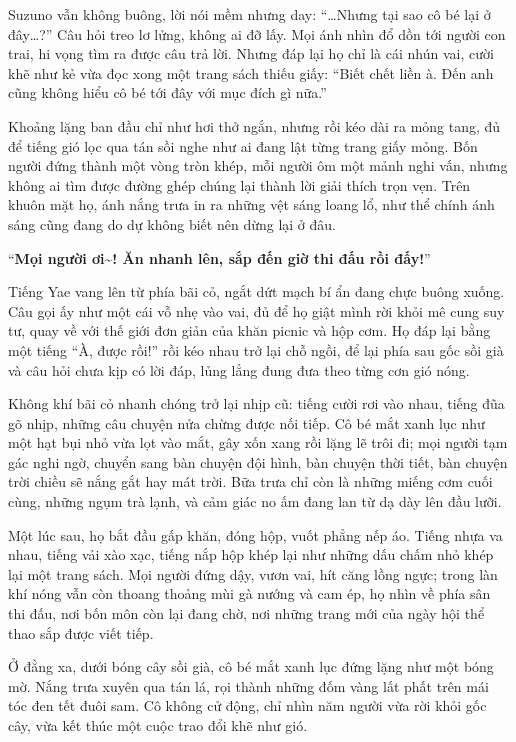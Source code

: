 \documentclass[../main.tex]{subfiles}
\begin{document}
Suzuno vẫn không buông, lời nói mềm nhưng day: ``\dots Nhưng tại sao cô bé lại ở đây\dots?'' Câu hỏi treo lơ lửng, không ai đỡ lấy. Mọi ánh nhìn đổ dồn tới người con trai, hi vọng tìm ra được câu trả lời. Nhưng đáp lại họ chỉ là cái nhún vai, cười khẽ như kẻ vừa đọc xong một trang sách thiếu giấy: ``Biết chết liền à. Đến anh cũng không hiểu cô bé tới đây với mục đích gì nữa.''

Khoảng lặng ban đầu chỉ như hơi thở ngắn, nhưng rồi kéo dài ra mỏng tang, đủ để tiếng gió lọc qua tán sồi nghe như ai đang lật từng trang giấy mỏng. Bốn người đứng thành một vòng tròn khép, mỗi người ôm một mảnh nghi vấn, nhưng không ai tìm được đường ghép chúng lại thành lời giải thích trọn vẹn. Trên khuôn mặt họ, ánh nắng trưa in ra những vệt sáng loang lổ, như thể chính ánh sáng cũng đang do dự không biết nên dừng lại ở đâu.

``\textbf{Mọi người ơi\~{}! Ăn nhanh lên, sắp đến giờ thi đấu rồi đấy!}''

Tiếng Yae vang lên từ phía bãi cỏ, ngắt dứt mạch bí ẩn đang chực buông xuống. Câu gọi ấy như một cái vỗ nhẹ vào vai, đủ để họ giật mình rời khỏi mê cung suy tư, quay về với thế giới đơn giản của khăn picnic và hộp cơm. Họ đáp lại bằng một tiếng ``À, được rồi!'' rồi kéo nhau trở lại chỗ ngồi, để lại phía sau gốc sồi già và câu hỏi chưa kịp có lời đáp, lủng lẳng đung đưa theo từng cơn gió nóng.

Không khí bãi cỏ nhanh chóng trở lại nhịp cũ: tiếng cười rơi vào nhau, tiếng đũa gõ nhịp, những câu chuyện nửa chừng được nối tiếp. Cô bé mắt xanh lục như một hạt bụi nhỏ vừa lọt vào mắt, gây xốn xang rồi lặng lẽ trôi đi; mọi người tạm gác nghi ngờ, chuyển sang bàn chuyện đội hình, bàn chuyện thời tiết, bàn chuyện trời chiều sẽ nắng gắt hay mát trời. Bữa trưa chỉ còn là những miếng cơm cuối cùng, những ngụm trà lạnh, và cảm giác no ấm đang lan từ dạ dày lên đầu lưỡi.

Một lúc sau, họ bắt đầu gấp khăn, đóng hộp, vuốt phẳng nếp áo. Tiếng nhựa va nhau, tiếng vải xào xạc, tiếng nắp hộp khép lại như những dấu chấm nhỏ khép lại một trang sách. Mọi người đứng dậy, vươn vai, hít căng lồng ngực; trong làn khí nóng vẫn còn thoang thoảng mùi gà nướng và cam ép, họ nhìn về phía sân thi đấu, nơi bốn môn còn lại đang chờ, nơi những trang mới của ngày hội thể thao sắp được viết tiếp.

\il

Ở đằng xa, dưới bóng cây sồi già, cô bé mắt xanh lục đứng lặng như một bóng mờ. Nắng trưa xuyên qua tán lá, rọi thành những đốm vàng lất phất trên mái tóc đen tết đuôi sam. Cô không cử động, chỉ nhìn năm người vừa rời khỏi gốc cây, vừa kết thúc một cuộc trao đổi khẽ như gió.
\end{document}
